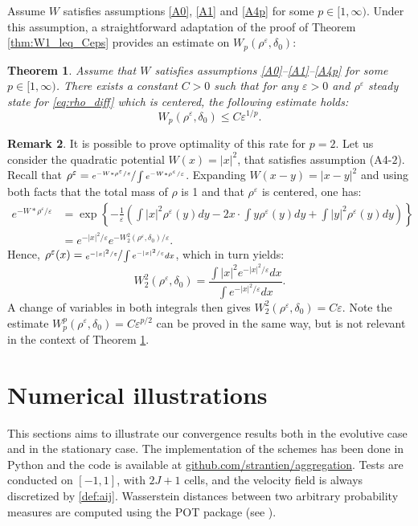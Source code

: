 \documentclass[JEP,XML,SOM,Unicode, NoFloatCountersInSection,published]{cedram}
\def\eps{\varepsilon}
\theoremstyle{plain}
\newtheorem{theorem}{Theorem}[section]
\theoremstyle{definition}
\newtheorem{remark}[theorem]{Remark}
\begin{document}
Assume $W$ satisfies assumptions \eqref{A0}, \eqref{A1} and \eqref{A4p} for some $p \in [1, \infty)$. Under this assumption, a straightforward adaptation of the proof of Theorem \ref{thm:W1_leq_Ceps} provides an estimate on $W_p(\rho^\eps, \delta_0)$:
\begin{theorem}\label{TWp}
Assume that $W$ satisfies assumptions \eqref{A0}--\eqref{A1}--\eqref{A4p} for some $p \in [1, \infty)$. There exists a constant $C > 0$ such that for any $\eps>0$ and $\rho^\eps$ steady state for \eqref{eq:rho_diff} which is centered, the following estimate holds:
\begin{equation}\label{Wp_leq_Ceps_bis}
W_p(\rho^\eps, \delta_0) \leq C\eps^{1/p}.
\end{equation}
\end{theorem}
\begin{remark}
It is possible to prove optimality of this rate for $p=2$. Let us consider the quadratic potential $W(x) = |x|^2$, that satisfies assumption (A4-$2$). Recall that $\rho^\eps = \sfrac{e^{-W * \rho^\eps / \eps}}{\int e^{-W * \rho^\eps / \eps}}$. Expanding $W(x-y) = |x-y|^2$ and using both facts that the total mass of $\rho$ is 1 and that $\rho^\eps$ is centered, one has:
\begin{align*}
e^{-W * \rho^\eps / \eps} & = \exp\left\lbrace -\frac{1}{\eps} \left(\int|x|^2 \rho^\eps(y) dy - 2x \cdot \int y \rho^\eps(y) dy + \int|y|^2\rho^\eps(y) dy \right) \right\rbrace \\
& = e^{-|x|^2/\eps} e^{-W_2^2(\rho^\eps, \delta_0)/\eps}.
\end{align*}
Hence, $\rho^\eps(x) = \sfrac{e^{-|x|^2 / \eps}}{\int e^{-|x|^2 / \eps} dx}$, which in turn yields:
\[
W_2^2(\rho^\eps, \delta_0) = \frac{\int |x|^2 e^{-|x|^2 / \eps} dx}{\int e^{-|x|^2 / \eps} dx}.
\]
A change of variables in both integrals then gives $W_2^2(\rho^\eps, \delta_0) = C\eps$. Note the estimate $W_p^p(\rho^\eps, \delta_0) = C\eps^{p/2}$ can be proved in the same way, but is not relevant in the context of Theorem \ref{TWp}.
\end{remark}

\section{Numerical illustrations}\label{section:numerics}

This sections aims to illustrate our convergence results both in the evolutive case and in the stationary case. The implementation of the schemes has been done in Python and the code is available at \href{https://github.com/strantien/aggregation}{github.com/strantien/aggregation}. Tests are conducted on $[-1,1]$, with $2J+1$ cells, and the velocity field is always discretized by \eqref{def:aij}. Wasserstein distances between two arbitrary probability measures are computed using the POT package (see \cite{flamary2021pot}).
\end{document}
